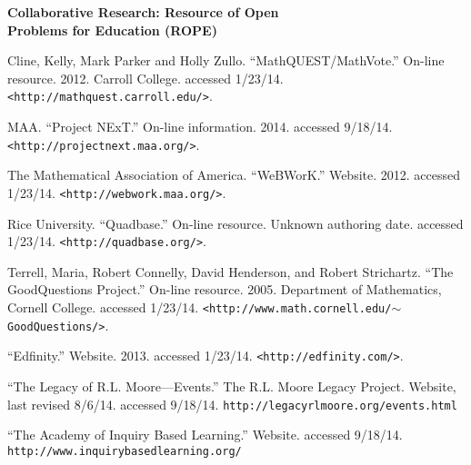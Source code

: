 \documentclass[11pt]{article}
\begin{document}
\begin{center}
{\Large \textbf{Collaborative Research: Resource of Open\\
Problems for Education (ROPE)}}
\end{center}

\begin{thebibliography}{9}

 Cline, Kelly, Mark Parker and Holly Zullo.
    ``MathQUEST/MathVote.'' On-line resource. 2012.  Carroll College.
    accessed 1/23/14.
    \texttt{<http://mathquest.carroll.edu/>}.

 MAA.  ``Project NExT.''  On-line information.  2014.
    accessed 9/18/14.\\
    \texttt{<http://projectnext.maa.org/>}.

 The Mathematical Association of America.  ``WeBWorK.''
    Website.  2012.  accessed 1/23/14.
    \texttt{<http://webwork.maa.org/>}.

 Rice University.  ``Quadbase.''  On-line resource.
    Unknown authoring date.  accessed 1/23/14.
    \texttt{<http://quadbase.org/>}.

 Terrell, Maria, Robert Connelly, David Henderson,
    and Robert Strichartz.  ``The GoodQuestions Project.''  On-line
    resource.  2005. Department of Mathematics, Cornell College.  accessed
    1/23/14.
    \texttt{<http://www.math.cornell.edu/$\sim$GoodQuestions/>}.

 ``Edfinity.''  Website.  2013.  accessed 1/23/14.
    \texttt{<http://edfinity.com/>}.

 ``The Legacy of R.L. Moore---Events.''  The
  R.L. Moore Legacy Project.  Website, last revised 8/6/14.  accessed
  9/18/14. 
  \texttt{http://legacyrlmoore.org/events.html}

 ``The Academy of Inquiry Based Learning.''
  Website.  accessed 9/18/14.\\
  \texttt{http://www.inquirybasedlearning.org/}



\end{thebibliography}
\end{document}

